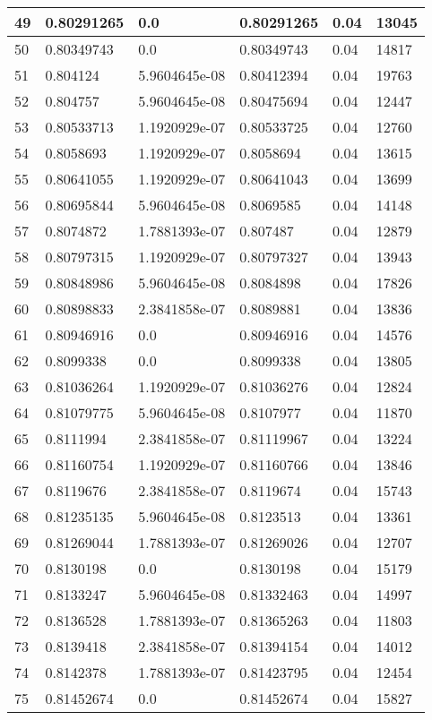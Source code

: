 \begin{longtable}{|l|l|l|l|l|l|}
49 & 0.80291265 & 0.0 & 0.80291265 & 0.04 & 13045 \\ \hline 
50 & 0.80349743 & 0.0 & 0.80349743 & 0.04 & 14817 \\ \hline 
51 & 0.804124 & 5.9604645e-08 & 0.80412394 & 0.04 & 19763 \\ \hline 
52 & 0.804757 & 5.9604645e-08 & 0.80475694 & 0.04 & 12447 \\ \hline 
53 & 0.80533713 & 1.1920929e-07 & 0.80533725 & 0.04 & 12760 \\ \hline 
54 & 0.8058693 & 1.1920929e-07 & 0.8058694 & 0.04 & 13615 \\ \hline 
55 & 0.80641055 & 1.1920929e-07 & 0.80641043 & 0.04 & 13699 \\ \hline 
56 & 0.80695844 & 5.9604645e-08 & 0.8069585 & 0.04 & 14148 \\ \hline 
57 & 0.8074872 & 1.7881393e-07 & 0.807487 & 0.04 & 12879 \\ \hline 
58 & 0.80797315 & 1.1920929e-07 & 0.80797327 & 0.04 & 13943 \\ \hline 
59 & 0.80848986 & 5.9604645e-08 & 0.8084898 & 0.04 & 17826 \\ \hline 
60 & 0.80898833 & 2.3841858e-07 & 0.8089881 & 0.04 & 13836 \\ \hline 
61 & 0.80946916 & 0.0 & 0.80946916 & 0.04 & 14576 \\ \hline 
62 & 0.8099338 & 0.0 & 0.8099338 & 0.04 & 13805 \\ \hline 
63 & 0.81036264 & 1.1920929e-07 & 0.81036276 & 0.04 & 12824 \\ \hline 
64 & 0.81079775 & 5.9604645e-08 & 0.8107977 & 0.04 & 11870 \\ \hline 
65 & 0.8111994 & 2.3841858e-07 & 0.81119967 & 0.04 & 13224 \\ \hline 
66 & 0.81160754 & 1.1920929e-07 & 0.81160766 & 0.04 & 13846 \\ \hline 
67 & 0.8119676 & 2.3841858e-07 & 0.8119674 & 0.04 & 15743 \\ \hline 
68 & 0.81235135 & 5.9604645e-08 & 0.8123513 & 0.04 & 13361 \\ \hline 
69 & 0.81269044 & 1.7881393e-07 & 0.81269026 & 0.04 & 12707 \\ \hline 
70 & 0.8130198 & 0.0 & 0.8130198 & 0.04 & 15179 \\ \hline 
71 & 0.8133247 & 5.9604645e-08 & 0.81332463 & 0.04 & 14997 \\ \hline 
72 & 0.8136528 & 1.7881393e-07 & 0.81365263 & 0.04 & 11803 \\ \hline 
73 & 0.8139418 & 2.3841858e-07 & 0.81394154 & 0.04 & 14012 \\ \hline 
74 & 0.8142378 & 1.7881393e-07 & 0.81423795 & 0.04 & 12454 \\ \hline 
75 & 0.81452674 & 0.0 & 0.81452674 & 0.04 & 15827 \\ \hline 
\end{longtable}